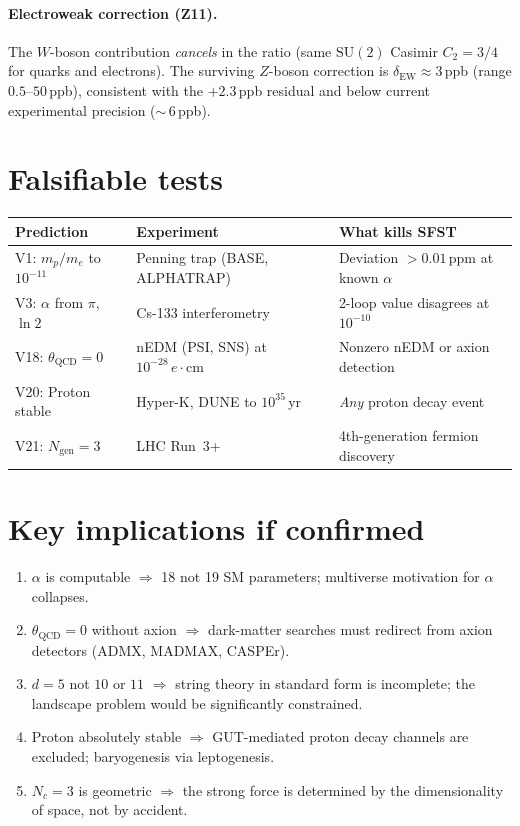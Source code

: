 \documentclass[11pt,a4paper]{article}
\begin{document}
\paragraph{Electroweak correction (Z11).}
The $W$-boson contribution \emph{cancels} in the ratio
(same $\mathrm{SU}(2)$ Casimir $C_2=3/4$ for quarks and electrons).
The surviving $Z$-boson correction is $\delta_{\mathrm{EW}} \approx 3\,$ppb
(range $0.5$--$50\,$ppb), consistent with the $+2.3\,$ppb residual
and below current experimental precision (${\sim}\,6\,$ppb).

\section*{Falsifiable tests}

\begin{center}
\renewcommand{\arraystretch}{1.15}\small
\begin{tabular}{lp{4cm}p{4.5cm}}
\toprule
\textbf{Prediction} & \textbf{Experiment} & \textbf{What kills SFST}\\
\midrule
V1: $m_p/m_e$ to $10^{-11}$
  & Penning trap (BASE, ALPHATRAP)
  & Deviation $>0.01\,$ppm at known $\alpha$\\
V3: $\alpha$ from $\pi$, $\ln 2$
  & Cs-133 interferometry
  & 2-loop value disagrees at $10^{-10}$\\
V18: $\theta_{\mathrm{QCD}}=0$
  & nEDM (PSI, SNS) at $10^{-28}\,e\!\cdot\!\mathrm{cm}$
  & Nonzero nEDM or axion detection\\
V20: Proton stable
  & Hyper-K, DUNE to $10^{35}\,$yr
  & \emph{Any} proton decay event\\
V21: $N_{\mathrm{gen}}=3$
  & LHC Run~3+
  & 4th-generation fermion discovery\\
\bottomrule
\end{tabular}
\end{center}

\section*{Key implications if confirmed}

\begin{enumerate}[leftmargin=1.5em,itemsep=0.2em]
\item $\alpha$ is computable $\Rightarrow$ 18 not 19 SM parameters; multiverse
  motivation for $\alpha$ collapses.
\item $\theta_{\mathrm{QCD}}=0$ without axion $\Rightarrow$ dark-matter
  searches must redirect from axion detectors (ADMX, MADMAX, CASPEr).
\item $d=5$ not $10$ or $11$ $\Rightarrow$ string theory in standard form
  is incomplete; the landscape problem would be significantly constrained.
\item Proton absolutely stable $\Rightarrow$ GUT-mediated proton decay channels are excluded;
  baryogenesis via leptogenesis.
\item $N_c=3$ is geometric $\Rightarrow$ the strong force is determined by
  the dimensionality of space, not by accident.
\end{enumerate}
\end{document}

